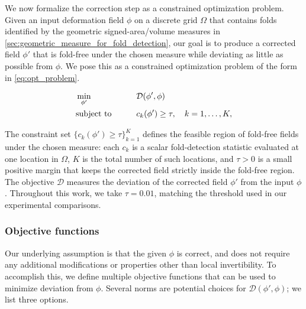 We now formalize the correction step as a constrained optimization problem. Given an input deformation field $\phi$ on a discrete grid $\Omega$ that contains folds identified by the geometric signed-area/volume measures in \autoref{sec:geometric_measure_for_fold_detection}, our goal is to produce a corrected field $\phi'$ that is fold-free under the chosen measure while deviating as little as possible from $\phi$. We pose this as a constrained optimization problem of the form in \autoref{eq:opt_problem}.

\begin{alignat}{2}
    & \min_{\phi'}            && \quad \mathcal{D}(\phi', \phi) \notag \\
    & \text{subject to} \quad && \quad c_k(\phi') \geq \tau, \quad k = 1, \ldots, K,
    \label{eq:opt_problem}
\end{alignat}

The constraint set $\{c_k(\phi') \geq \tau\}_{k=1}^{K}$ defines the feasible region of fold-free fields under the chosen measure: each $c_k$ is a scalar fold-detection statistic evaluated at one location in $\Omega$, $K$ is the total number of such locations, and $\tau > 0$ is a small positive margin that keeps the corrected field strictly inside the fold-free region. The objective $\mathcal{D}$ measures the deviation of the corrected field $\phi'$ from the input $\phi$. Throughout this work, we take $\tau = 0.01$, matching the threshold used in our experimental comparisons.


\subsubsection{Objective functions}
\label{sec:objective_functions}

Our underlying assumption is that the given $\phi$ is correct, and does not require any additional modifications or properties other than local invertibility. To accomplish this, we define multiple objective functions that can be used to minimize deviation from $\phi$. Several norms are potential choices for $\mathcal{D}(\phi', \phi)$; we list three options.

